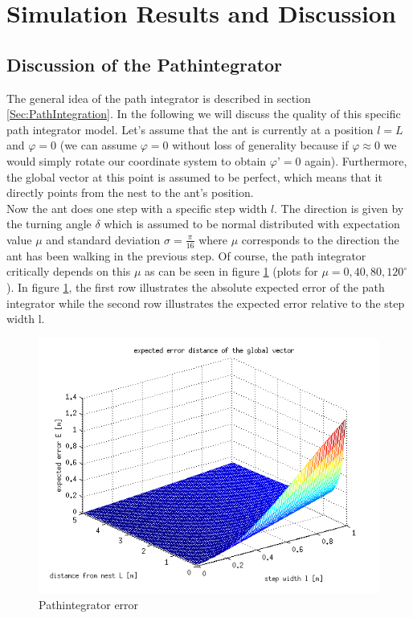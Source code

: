 \documentclass[11pt]{article}
\begin{document}



%

\section{Simulation Results and Discussion}
\subsection{Discussion of the Pathintegrator}
The general idea of the path integrator is described in section \ref{Sec:PathIntegration}. In the following we will discuss the quality of this specific path integrator model.
Let’s assume that the ant is currently at a position $l = L$ and $\varphi = 0$ (we can assume $\varphi = 0$ without loss of generality because if $\varphi \approx 0$ we would simply rotate our coordinate system to obtain $\varphi’ = 0$ again). Furthermore, the global vector at this point is assumed to be perfect, which means that it directly points from the nest to the ant’s position. \\
Now the ant does one step with a specific step width $l$. The direction is given by the turning angle $\delta$ which is assumed to be normal distributed with expectation value $\mu$ and standard deviation $\sigma = \frac{\pi}{16}$ where $\mu$ corresponds to the direction the ant has been walking in the previous step. Of course, the path integrator critically depends on this $\mu$ as can be seen in figure \ref{fig:PathintegratorError} (plots for $\mu=0,40,80,120^{\circ}$). In figure \ref{fig:PathintegratorError}, the first row illustrates the absolute expected error of the path integrator while the second row illustrates the expected error relative to the step width l.
\begin{figure}[H]
\centering
\includegraphics[scale=0.31]{./Pics/Pathintegrator_error_plot.png} 
\caption{Pathintegrator error \label{fig:PathintegratorError} }
\end{figure} 
\end{document}
